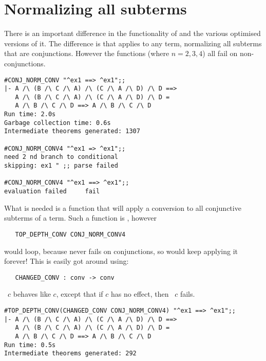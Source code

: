 \section{Normalizing all subterms}

There is an important difference in the functionality of
 and the various optimised versions of it. The
difference is that  applies to any term,
normalizing all subterms that are conjunctions. However the functions
 (where {\small $n = 2,3,4$}) all
fail on non-conjunctions.

\begin{session}\begin{verbatim}
#CONJ_NORM_CONV "^ex1 ==> ^ex1";;
|- A /\ (B /\ C /\ A) /\ (C /\ A /\ D) /\ D ==>
   A /\ (B /\ C /\ A) /\ (C /\ A /\ D) /\ D =
   A /\ B /\ C /\ D ==> A /\ B /\ C /\ D
Run time: 2.0s
Garbage collection time: 0.6s
Intermediate theorems generated: 1307

#CONJ_NORM_CONV4 "^ex1 => ^ex1";;
need 2 nd branch to conditional
skipping: ex1 " ;; parse failed

#CONJ_NORM_CONV4 "^ex1 ==> ^ex1";;
evaluation failed     fail
\end{verbatim}\end{session}

What is needed is a function that will apply a conversion to all
conjunctive subterms of a term. Such a function is , however

\begin{hol}\begin{verbatim}
   TOP_DEPTH_CONV CONJ_NORM_CONV4
\end{verbatim}\end{hol}

\noindent would loop, because  never fails on
conjunctions, so  would keep applying it forever!
This is easily got around using:

\begin{hol}\begin{verbatim}
   CHANGED_CONV : conv -> conv
\end{verbatim}\end{hol}

\noindent {}~$c$ behaves like $c$, except that if $c$
has no effect, then ~$c$ fails.

\begin{session}\begin{verbatim}
#TOP_DEPTH_CONV(CHANGED_CONV CONJ_NORM_CONV4) "^ex1 ==> ^ex1";;
|- A /\ (B /\ C /\ A) /\ (C /\ A /\ D) /\ D ==>
   A /\ (B /\ C /\ A) /\ (C /\ A /\ D) /\ D =
   A /\ B /\ C /\ D ==> A /\ B /\ C /\ D
Run time: 0.5s
Intermediate theorems generated: 292
\end{verbatim}\end{session}

